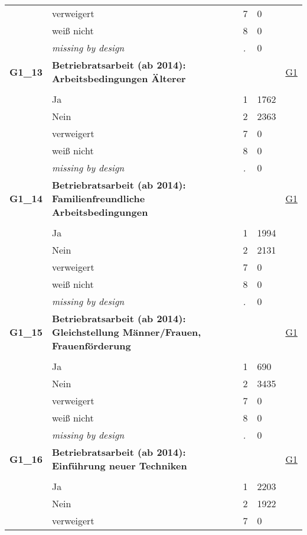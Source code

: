 \begin{longtable}{| L{2.65cm} | L{8cm} | C{1.5cm} | R{1.25cm} | C{2.25cm}  |}
   & verweigert & 7 & 0 &  \\ 
   & weiß nicht & 8 & 0 &  \\ 
   & \textit{missing by design} & \textit{.} & 0 &  \\ 
   \midrule
\textbf{G1\_13}\label{var:G1:13} & \textbf{Betriebratsarbeit (ab 2014): Arbeitsbedingungen Älterer} &  &  & \hyperref[G1]{G1} \\ 
   &  &  &  &  \\ 
   & Ja & 1 & 1762 &  \\ 
   & Nein & 2 & 2363 &  \\ 
   & verweigert & 7 & 0 &  \\ 
   & weiß nicht & 8 & 0 &  \\ 
   & \textit{missing by design} & \textit{.} & 0 &  \\ 
   \midrule
\textbf{G1\_14}\label{var:G1:14} & \textbf{Betriebratsarbeit (ab 2014): Familienfreundliche Arbeitsbedingungen} &  &  & \hyperref[G1]{G1} \\ 
   &  &  &  &  \\ 
   & Ja & 1 & 1994 &  \\ 
   & Nein & 2 & 2131 &  \\ 
   & verweigert & 7 & 0 &  \\ 
   & weiß nicht & 8 & 0 &  \\ 
   & \textit{missing by design} & \textit{.} & 0 &  \\ 
   \midrule
\textbf{G1\_15}\label{var:G1:15} & \textbf{Betriebratsarbeit (ab 2014): Gleichstellung Männer/Frauen, Frauenförderung} &  &  & \hyperref[G1]{G1} \\ 
   &  &  &  &  \\ 
   & Ja & 1 & 690 &  \\ 
   & Nein & 2 & 3435 &  \\ 
   & verweigert & 7 & 0 &  \\ 
   & weiß nicht & 8 & 0 &  \\ 
   & \textit{missing by design} & \textit{.} & 0 &  \\ 
   \midrule
\textbf{G1\_16}\label{var:G1:16} & \textbf{Betriebratsarbeit (ab 2014): Einführung neuer Techniken} &  &  & \hyperref[G1]{G1} \\ 
   &  &  &  &  \\ 
   & Ja & 1 & 2203 &  \\ 
   & Nein & 2 & 1922 &  \\ 
   & verweigert & 7 & 0 &  \\ 

\end{longtable}
